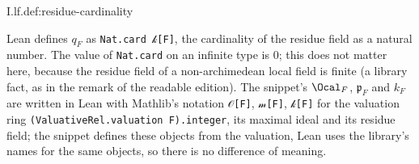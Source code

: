 \begin{definition}
\end{definition}
\begin{tfformal}{I.lf.def:residue-cardinality}
\begin{tffidelity}
Lean defines $q_F$ as \texttt{Nat.card 𝓀[F]}, the cardinality of the residue field as a natural number. The value of \texttt{Nat.card} on an infinite type is $0$; this does not matter here, because the residue field of a non-archimedean local field is finite (a library fact, as in the remark of the readable edition). The snippet's $\Ocal_F$, $\mathfrak p_F$ and $k_F$ are written in Lean with Mathlib's notation \texttt{𝒪[F]}, \texttt{𝓂[F]}, \texttt{𝓀[F]} for the valuation ring \texttt{(ValuativeRel.valuation F).integer}, its maximal ideal and its residue field; the snippet defines these objects from the valuation, Lean uses the library's names for the same objects, so there is no difference of meaning.
\end{tffidelity}
\end{tfformal}

